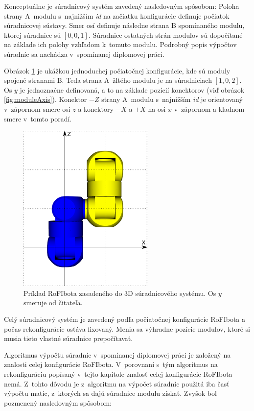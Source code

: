 \documentclass[
  printed, %
  oneside, %
  notable,   %
  nolof,     %
  nolot,     %
]{fithesis3}
\begin{document}
Konceptuálne je súradnicový systém zavedený nasledovným spôsobom: Poloha strany A~modulu s~najnižším \textit{id} na začiatku konfigurácie definuje počiatok súradnicovej sústavy. Smer osí definuje následne strana B spomínaného modulu, ktorej súradnice sú $[0, 0, 1]$. Súradnice ostatných strán modulov sú dopočítané na základe ich polohy vzhľadom k~tomuto modulu. Podrobný popis výpočtov súradníc sa nachádza v~spomínanej diplomovej práci.  

Obrázok \ref{fig:moduleCoordinates} je ukážkou jednoduchej počiatočnej konfigurácie, kde sú moduly spojené stranami B. Teda strana A~žltého modulu je na súradniciach $[1, 0, 2]$. Os $y$ je jednoznačne definovaná, a to na základe pozícií konektorov (viď obrázok \ref{fig:moduleAxis}). Konektor $-Z$ strany A~modulu s~najnižším \textit{id} je orientovaný v~zápornom smere osi $z$ a konektory $-X$ a $+X$ na osi $x$ v~zápornom a kladnom smere v~tomto poradí. 

\begin{figure}[hbt!]
    \centering
    \includegraphics[width=0.6\textwidth]{pictures/module_coordinates.pdf}
    \caption[Ukážka súradnicového systému]{Príklad RoFIbota zasadeného do 3D súradnicového systému. Os $y$ smeruje od čitateľa. }
    \label{fig:moduleCoordinates}
\end{figure}

Celý súradnicový systém je zavedený podľa počiatočnej konfigurácie RoFIbota a počas rekonfigurácie ostáva fixovaný. Menia sa výhradne pozície modulov, ktoré si musia tieto vlastné súradnice prepočítavať. 

Algoritmus výpočtu súradníc v~spomínanej diplomovej práci je založený na znalosti celej konfigurácie RoFIbota. V~porovnaní s~tým algoritmus na rekonfiguráciu popísaný v~tejto kapitole znalosť celej konfigurácie RoFIbota nemá. Z~tohto dôvodu je z~algoritmu na výpočet súradníc použitá iba časť výpočtu matíc, z~ktorých sa dajú súradnice modulu získať. Zvyšok bol pozmenený nasledovným spôsobom: 
\end{document}

